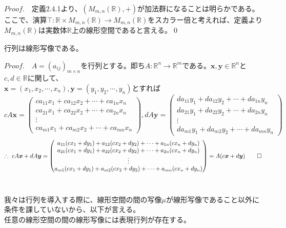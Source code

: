\documentclass[dvipdfmx]{jsarticle}
\begin{document}
$Proof.$　定義2.4.1より、$(M_{m,n}(\mathbb{R}),+)$が加法群になることは明らかである。\\
ここで、演算$\top:\mathbb{R} \times M_{m,n}(\mathbb{R}) \to M_{m,n}(\mathbb{R})$をスカラー倍と考えれば、定義より$M_{m,n}(\mathbb{R})$は実数体$\mathbb{R}$上の線形空間であると言える。\qed\\\par
{}行列は線形写像である。\\\par
$Proof.$　$A=(a_{ij})_{m \times n}$を行列とする。即ち$A:\mathbb{R}^n\to\mathbb{R}^m$である。$\bm{x},\bm{y}\in\mathbb{R}^n$と$c,d\in\mathbb{R}$に関して、\\$\bm{x}=(x_1,x_2,\cdots,x_n),\bm{y}=(y_1,y_2,\cdots,y_n)$とすれば
\[cA\bm{x}=\begin{pmatrix}ca_{11}x_1+ca_{12}x_2+\cdots+ca_{1n}x_n\\ca_{21}x_1+ca_{22}x_2+\cdots+ca_{2n}x_n\\\vdots\\ca_{m1}x_1+ca_{m2}x_2+\cdots+ca_{mn}x_n\end{pmatrix},dA\bm{y}=\begin{pmatrix}da_{11}y_1+da_{12}y_2+\cdots+da_{1n}y_n\\da_{21}y_1+da_{22}y_2+\cdots+da_{2n}y_n\\\vdots\\da_{m1}y_1+da_{m2}y_2+\cdots+da_{mn}y_n\end{pmatrix}\]
\[\therefore~cA\bm{x}+dA\bm{y}=\begin{pmatrix}a_{11}(cx_1+dy_1)+a_{12}(cx_2+dy_2)+\cdots+a_{1n}(cx_n+dy_n)\\a_{21}(cx_1+dy_1)+a_{22}(cx_2+dy_2)+\cdots+a_{2n}(cx_n+dy_n)\\\vdots\\a_{m1}(cx_1+dy_1)+a_{m2}(cx_2+dy_2)+\cdots+a_{mn}(cx_n+dy_n)\end{pmatrix}=A(c\bm{x}+d\bm{y})\qed\]\\\par
我々は行列を導入する際に、線形空間の間の写像$\mu$が線形写像であること以外に条件を課していないから、以下が言える。\\
任意の線形空間の間の線形写像には表現行列が存在する。
\end{document}
